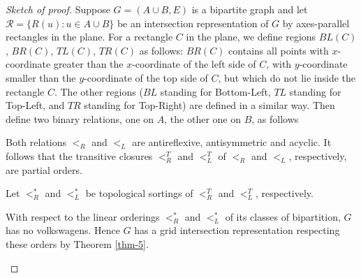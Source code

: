 \begin{proof}[Sketch of proof]
	Suppose $G = (A \cup B, E)$ is a bipartite graph and let $\mathcal{R} = \{R(u) : u \in A \cup B\}$ be an intersection representation of $G$ by axes-parallel rectangles in the plane. For a rectangle $C$ in the plane, we define regions $BL(C)$, $BR(C)$, $TL(C)$, $TR(C)$ as follows: $BR(C)$ contains all points with $x$-coordinate greater than the $x$-coordinate of the left side of $C$, with $y$-coordinate smaller than the $y$-coordinate of the top side of $C$, but which do not lie inside the rectangle $C$. The other regions ($BL$ standing for Bottom-Left, $TL$ standing for Top-Left, and $TR$ standing for Top-Right) are defined in a similar way. Then define two binary relations, one on $A$, the other one on $B$, as follows
	
	\begin{claim}
		Both relations $<_R$ and $<_L$ are antireflexive, antisymmetric and acyclic. It follows that the transitive closures $<_{R}^T$ and $<_{L}^T$ of $<_R$ and $<_L$, respectively, are partial orders.
	\end{claim}
	
	Let $<_R^\ast$ and $<_L^\ast$ be topological sortings of $<_R^T$ and $<_L^T$, respectively.
	
	\begin{claim}
		With respect to the linear orderings $<_R^\ast$ and $<_L^\ast$ of its classes of bipartition, $G$ has no volkswagens. Hence $G$ has a grid intersection representation respecting these orders by Theorem \ref{thm-5}.
	\end{claim}
\end{proof}